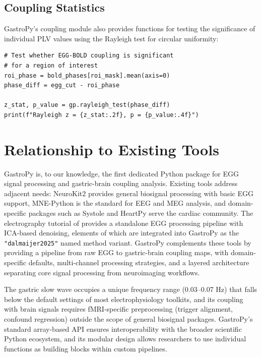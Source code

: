 \documentclass[12pt]{article}
\begin{document}
\subsection{Coupling Statistics}

GastroPy's coupling module also provides functions for testing the
significance of individual PLV values using the Rayleigh test for circular
uniformity:

\begin{lstlisting}
# Test whether EGG-BOLD coupling is significant
# for a region of interest
roi_phase = bold_phases[roi_mask].mean(axis=0)
phase_diff = egg_cut - roi_phase

z_stat, p_value = gp.rayleigh_test(phase_diff)
print(f"Rayleigh z = {z_stat:.2f}, p = {p_value:.4f}")
\end{lstlisting}

\section{Relationship to Existing Tools}

GastroPy is, to our knowledge, the first dedicated Python package for EGG
signal processing and gastric-brain coupling analysis. Existing tools address
adjacent needs: NeuroKit2 \citep{Makowski2021} provides general biosignal
processing with basic EGG support, MNE-Python \citep{Gramfort2013} is the
standard for EEG and MEG analysis, and domain-specific packages such as
Systole \citep{Legrand2020} and HeartPy \citep{vanGent2019} serve the cardiac
community. The electrography tutorial of \citet{Anisimova2025} provides a
standalone EGG processing pipeline with ICA-based denoising, elements
of which are integrated into GastroPy as the \texttt{"dalmaijer2025"} named
method variant. GastroPy complements these tools by providing
a pipeline from raw EGG to gastric-brain coupling maps, with
domain-specific defaults, multi-channel processing strategies, and a layered
architecture separating core signal processing from neuroimaging workflows.

The gastric slow wave occupies a unique frequency range (0.03--0.07 Hz) that
falls below the default settings of most electrophysiology toolkits, and its
coupling with brain signals requires fMRI-specific preprocessing (trigger
alignment, confound regression) outside the scope of general biosignal
packages. GastroPy's standard array-based API ensures interoperability with
the broader scientific Python ecosystem, and its modular design allows
researchers to use individual functions as building blocks within custom
pipelines.
\end{document}
